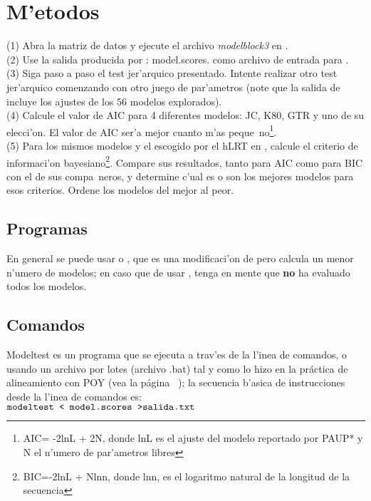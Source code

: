 \section{M'etodos}
\noindent
(1) Abra la matriz de datos y ejecute el archivo \textit{modelblock3} en .\\
(2) Use la salida producida por : model.scores. como archivo de entrada para .\\
(3) Siga paso a paso el test jer'arquico presentado. Intente realizar otro test jer'arquico comenzando con otro juego de par'ametros (note que la salida de  incluye los ajustes de los 56 modelos explorados).\\
(4) Calcule el valor de AIC para 4 diferentes modelos: JC, K80, GTR y uno de su elecci'on. El valor de AIC ser'a mejor cuanto m'as peque~no\footnote{AIC= -2lnL + 2N, donde lnL es el ajuste del modelo reportado por PAUP* y N el n'umero de par'ametros libres}.\\
(5) Para los mismos modelos y el escogido por el hLRT en , calcule el criterio de informaci'on bayesiano\footnote{BIC=-2lnL + Nlnn, donde lnn, es el logaritmo natural de la longitud de la secuencia}. Compare sus resultados, tanto para AIC como para BIC con el de sus compa~neros, y determine c'ual es o son los mejores modelos para esos criterios. Ordene los modelos del mejor al peor. 

\subsection{Programas}
\noindent
En general se puede usar  o , que es una modificaci'on de  pero calcula un menor n'umero de modelos; en caso que de usar , tenga en mente que \textbf{no} ha evaluado todos los modelos.

\subsection{Comandos}
\noindent
Modeltest es un programa que se ejecuta a trav'es de la l'inea de comandos, o usando un archivo por lotes (archivo .bat) tal y como lo hizo en la pr\'actica de alineamiento con POY (vea la p\'agina ~\pageref{ch:alinear}); la secuencia b'asica de instrucciones desde la l'inea de comandos es:\\

\begin{math}
\texttt{modeltest  < model.scores >salida.txt}
\end{math}\\ 

